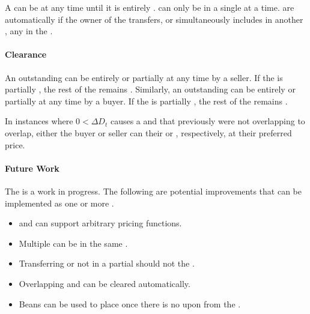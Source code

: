 \documentclass[class=article, crop=false]{standalone}
\begin{document}
A  can be  at any time until it is entirely .  can only be  in a single  at a time.  are automatically  if the owner of the  transfers, or simultaneously includes in another , any  in the .

\paragraph{Clearance}

An outstanding  can be entirely or partially  at any time by a  seller. If the  is partially , the rest of the  remains . Similarly, an outstanding  can be entirely or partially  at any time by a  buyer. If the  is partially , the rest of the  remains .

In instances where $0 < \Delta D_t$ causes a  and  that previously were not overlapping to overlap, either the buyer or seller can  their  or , respectively, at their preferred price. 

\paragraph{Future Work}

The  is a work in progress. The following are potential improvements that can be implemented as one or more .

\begin{itemize}
    \item {} and  can support arbitrary pricing functions. 
    \item Multiple  can be  in the same .
    \item Transferring or   not  in a partial  should not  the .
    \item Overlapping  and  can be cleared automatically. 
    \item {} Beans can be used to place  once there is no   upon  from the .
\end{itemize}
\end{document}

